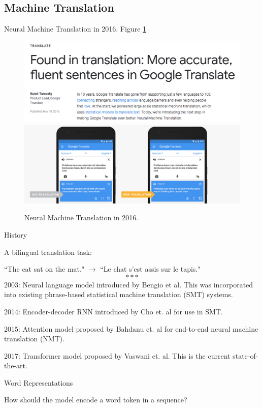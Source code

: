 \documentclass[english]{article}
\begin{document}
\subsection{Machine Translation}
\benum
\item 
 {Neural Machine Translation in 2016}.  Figure \ref{Neural Machine Translation in 2016}

\begin{figure}
\centering
\includegraphics[height=0.3\linewidth]{gt1.png}
\vspace{5mm}
\includegraphics[height=0.3\linewidth]{gt2.png}
    \caption{Neural Machine Translation in 2016.}
    \label{Neural Machine Translation in 2016}
\end{figure}
 
\item 
 {History}

A bilingual translation task:

``The cat sat on the mat." $\rightarrow$ ``Le chat s'est assis sur le tapis."
$$***$$
2003: Neural language model introduced by Bengio et al. This was incorporated into existing phrase-based statistical machine translation (SMT) systems.

2014: Encoder-decoder RNN introduced by Cho et. al for use in SMT.

2015: Attention model proposed by Bahdanu et. al for end-to-end neural machine translation (NMT).

2017: Transformer model proposed by Vaswani et. al. This is the current state-of-the-art.
 

\item 
 {Word Representations}

How should the model encode a word token in a sequence?
 
\end{document}
